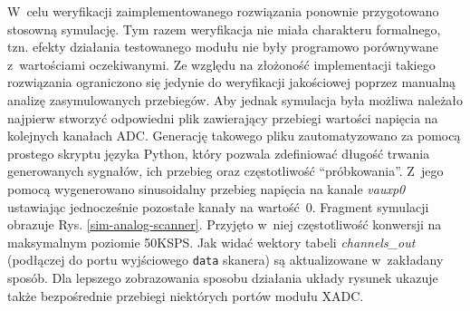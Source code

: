 W~celu weryfikacji zaimplementowanego rozwiązania ponownie przygotowano stosowną symulację. Tym razem weryfikacja nie miała charakteru formalnego, tzn. efekty działania testowanego modułu nie były programowo porównywane z~wartościami oczekiwanymi. Ze względu na złożoność implementacji takiego rozwiązania ograniczono się jedynie do weryfikacji jakościowej poprzez manualną analizę zasymulowanych przebiegów. Aby jednak symulacja była możliwa należało najpierw stworzyć odpowiedni plik zawierający przebiegi wartości napięcia na kolejnych kanałach ADC. Generację takowego pliku zautomatyzowano za pomocą prostego skryptu języka Python, który pozwala zdefiniować długość trwania generowanych sygnałów, ich przebieg oraz częstotliwość ``próbkowania''. Z~jego pomocą wygenerowano sinusoidalny przebieg napięcia na kanale \textit{vauxp0} ustawiając jednocześnie pozostałe kanały na wartość~$0$. Fragment symulacji obrazuje Rys. \ref{sim-analog-scanner}. Przyjęto w~niej częstotliwość konwersji na maksymalnym poziomie 50KSPS. Jak widać wektory tabeli \textit{channels\_out} (podłączej do portu wyjściowego \verb|data| skanera) są aktualizowane w~zakładany sposób. Dla lepszego zobrazowania sposobu działania układy rysunek ukazuje także bezpośrednie przebiegi niektórych portów modułu XADC. 
